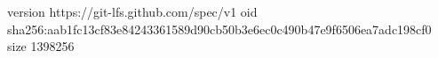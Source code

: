 version https://git-lfs.github.com/spec/v1
oid sha256:aab1fc13cf83e84243361589d90cb50b3e6ec0c490b47e9f6506ea7adc198cf0
size 1398256
